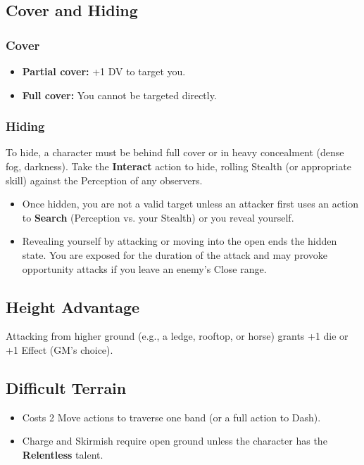 \subsection{Cover and Hiding}

\subsubsection{Cover}
\begin{itemize}
  \item \textbf{Partial cover:} +1 DV to target you.
  \item \textbf{Full cover:} You cannot be targeted directly.
\end{itemize}

\subsubsection{Hiding}
To hide, a character must be behind full cover or in heavy concealment (dense fog, darkness). Take the \textbf{Interact} action to hide, rolling Stealth (or appropriate skill) against the Perception of any observers.

\begin{itemize}
  \item Once hidden, you are not a valid target unless an attacker first uses an action to \textbf{Search} (Perception vs. your Stealth) or you reveal yourself.
  \item Revealing yourself by attacking or moving into the open ends the hidden state. You are exposed for the duration of the attack and may provoke opportunity attacks if you leave an enemy's Close range.
\end{itemize}

\subsection{Height Advantage}

Attacking from higher ground (e.g., a ledge, rooftop, or horse) grants +1 die or +1 Effect (GM's choice).

\subsection{Difficult Terrain}

\begin{itemize}
  \item Costs 2 Move actions to traverse one band (or a full action to Dash).
  \item Charge and Skirmish require open ground unless the character has the \textbf{Relentless} talent.
\end{itemize}

